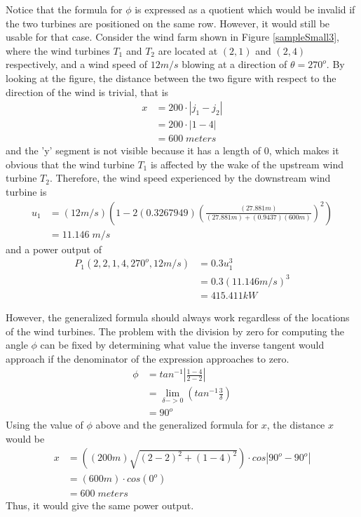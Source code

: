    Notice that the formula for $\phi$ is expressed as a quotient which would be invalid if the two turbines are positioned on the same row. However, it would still be usable for that case. Consider the wind farm shown in Figure \ref{sampleSmall3}, where the wind turbines $T_1$ and $T_2$ are located at $(2,1)$ and $(2,4)$ respectively, and a wind speed of $12m/s$ blowing at a direction of $\theta=270^o$. By looking at the figure, the distance between the two figure with respect to the direction of the wind is trivial, that is
    \begin{align*}
    	x
    	&= 200\cdot |j_1-j_2| \\
    	&= 200\cdot |1-4| \\ 
    	&= 600\;meters
    \end{align*}
    and the 'y' segment is not visible because it has a length of 0, which makes it obvious that the wind turbine $T_1$ is affected by the wake of the upstream wind turbine $T_2$. Therefore, the wind speed experienced by the downstream wind turbine is
    \begin{align*}
    	u_1
    	&= (12m/s)\left(1 - 2(0.3267949)\left(\frac{(27.881m)}{(27.881m)+(0.9437)(600m)}\right)^2\right) \\
    	&= 11.146\;m/s
    \end{align*}
    and a power output of
    \begin{align*}
    	P_1(2,2,1,4,270^o,12m/s)
    	&= 0.3u_1^3 \\
    	&= 0.3(11.146m/s)^3 \\ 
    	&= 415.411kW
    \end{align*}
    
    However, the generalized formula should always work regardless of the locations of the wind turbines. The problem with the division by zero for computing the angle $\phi$ can be fixed by determining what value the inverse tangent would approach if the denominator of the expression approaches to zero.
    \begin{align*}
    	\phi
    	&= tan^{-1} \left| \frac{1-4}{2-2} \right| \\
    	&= \lim_{\delta -> 0} \left( tan^{-1} \frac{3}{\delta} \right) \\
    	&= 90^o
    \end{align*}
    Using the value of $\phi$ above and the generalized formula for $x$, the distance $x$ would be
    \begin{align*}
    	x
    	&= \left( (200m)\sqrt{{(2-2)^2+(1-4)^2}} \right)\cdot cos\left| 90^o-90^o \right| \\
    	&= (600m)\cdot cos\left( 0^o \right) \\
    	&= 600\;meters
    \end{align*}
    Thus, it would give the same power output.
    
